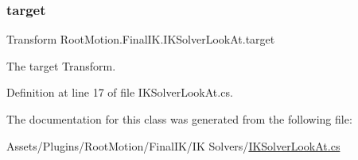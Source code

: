 \mbox{\label{class_root_motion_1_1_final_i_k_1_1_i_k_solver_look_at_a238d9010e1b97fa699b316f4284394d8}} 
\subsubsection{\texorpdfstring{target}{target}}
{\footnotesize\ttfamily Transform Root\+Motion.\+Final\+I\+K.\+I\+K\+Solver\+Look\+At.\+target}



The target Transform. 



Definition at line 17 of file I\+K\+Solver\+Look\+At.\+cs.



The documentation for this class was generated from the following file\+:\begin{DoxyCompactItemize}
\item 
Assets/\+Plugins/\+Root\+Motion/\+Final\+I\+K/\+I\+K Solvers/\mbox{\hyperlink{_i_k_solver_look_at_8cs}{I\+K\+Solver\+Look\+At.\+cs}}\end{DoxyCompactItemize}
